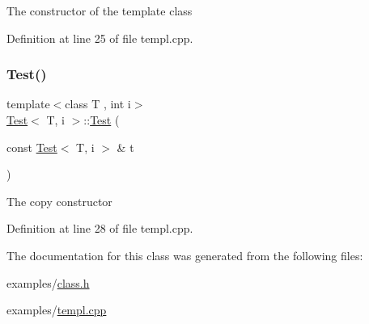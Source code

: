 The constructor of the template class 

Definition at line 25 of file templ.\+cpp.


\begin{DoxyCode}{0}

\end{DoxyCode}
\mbox{\label{class_test_adcf1bc755df94c4d07519c0a02aa1cc0}} 
\subsubsection{\texorpdfstring{Test()}{Test()}\hspace{0.1cm}{\footnotesize\ttfamily [2/2]}}
{\footnotesize\ttfamily template$<$class T , int i$>$ \\
\mbox{\hyperlink{class_test}{Test}}$<$ T, i $>$\+::\mbox{\hyperlink{class_test}{Test}} (\begin{DoxyParamCaption}\item[{const \mbox{\hyperlink{class_test}{Test}}$<$ T, i $>$ \&}]{t }\end{DoxyParamCaption})}

The copy constructor 

Definition at line 28 of file templ.\+cpp.


\begin{DoxyCode}{0}

\end{DoxyCode}


The documentation for this class was generated from the following files\+:\begin{DoxyCompactItemize}
\item 
examples/\mbox{\hyperlink{class_8h}{class.\+h}}\item 
examples/\mbox{\hyperlink{templ_8cpp}{templ.\+cpp}}\end{DoxyCompactItemize}
